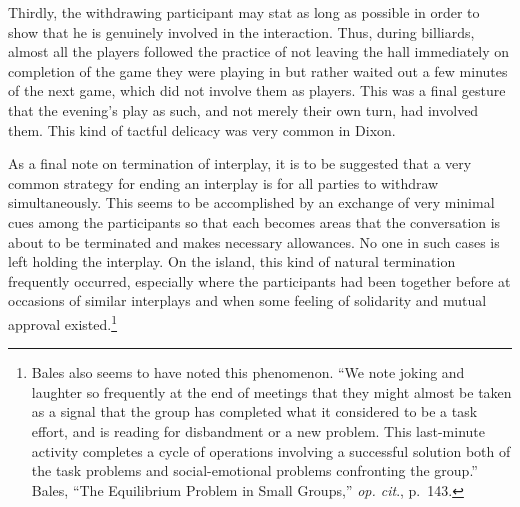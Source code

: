 \documentclass[openany,nobib]{tufte-book}
\begin{document}
Thirdly, the withdrawing participant may stat as long as possible in
order to show that he is genuinely involved in the interaction. Thus,
during billiards, almost all the players followed the practice of not
leaving the hall immediately on completion of the game they were playing
in but rather waited out a few minutes of the next game, which did not
involve them as players. This was a final gesture that the evening's
play as such, and not merely their own turn, had involved them. This
kind of tactful delicacy was very common in Dixon.

As a final note on termination of interplay, it is to be suggested that
a very common strategy for ending an interplay is for all parties to
withdraw simultaneously. This seems to be accomplished by an exchange of
very minimal cues among the participants so that each becomes areas that
the conversation is about to be terminated and makes necessary
allowances. No one in such cases is left holding the interplay. On the
island, this kind of natural termination frequently occurred, especially
where the participants had been together before at occasions of similar
interplays and when some feeling of solidarity and mutual approval
existed.\footnote{Bales also seems to have noted this phenomenon. ``We
  note joking and laughter so frequently at the end of meetings that
  they might almost be taken as a signal that the group has completed
  what it considered to be a task effort, and is reading for disbandment
  or a new problem. This last-minute activity completes a cycle of
  operations involving a successful solution both of the task problems
  and social-emotional problems confronting the group.'' Bales, ``The
  Equilibrium Problem in Small Groups,'' \emph{op. cit}., p.~143.}
\end{document}
